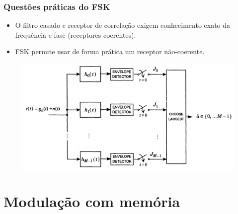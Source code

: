 \begin{frame}
	\frametitle{Questões práticas do FSK}

	\begin{itemize}
	    \item O filtro casado e receptor de correlação exigem conhecimento exato da frequência e fase (receptores coerentes).
	    \item FSK permite usar de forma prática um receptor não-coerente.
	\end{itemize}	
	\begin{figure}[t]	
	    \begin{center}
	    \includegraphics[width=0.8\columnwidth]{figs/adv_18}
	    \end{center}
	\end{figure}
\end{frame}

% 
% 


\section{Modulação com memória}

